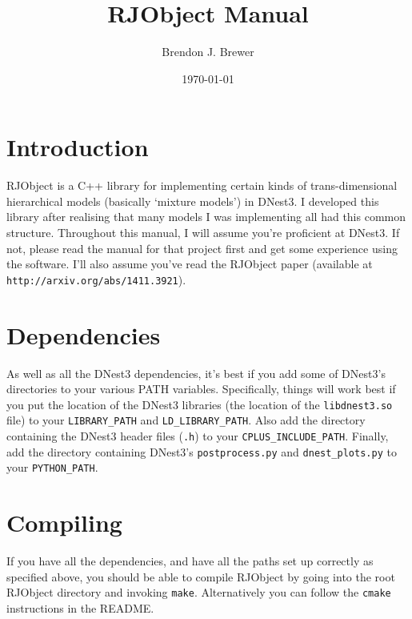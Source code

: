 \documentclass[a4paper, 11pt]{article}
\title{RJObject Manual}
\author{Brendon J. Brewer}
\date{\today}
\begin{document}
\maketitle

\section{Introduction}
RJObject is a C++ library for implementing certain kinds of trans-dimensional
hierarchical models (basically `mixture models') in DNest3. I developed this
library after realising that many models I was implementing all had this
common structure.
Throughout this manual, I will assume you're proficient at
DNest3. If not, please read the manual for that project first and get some
experience using the software. I'll also assume you've read the RJObject
paper (available at {\tt http://arxiv.org/abs/1411.3921}).

\section{Dependencies}
As well as all the DNest3 dependencies, it's best if you add some of DNest3's
directories to your various PATH variables. Specifically, things will work best
if you put the location of the DNest3 libraries (the location of
the {\tt libdnest3.so} file) to your {\tt LIBRARY\_PATH} and
{\tt LD\_LIBRARY\_PATH}. Also add the directory containing the DNest3 header
files ({\tt *.h}) to your {\tt CPLUS\_INCLUDE\_PATH}. Finally, add the
directory containing DNest3's {\tt postprocess.py} and {\tt dnest\_plots.py} to
your {\tt PYTHON\_PATH}.

\section{Compiling}
If you have all the dependencies, and have all the paths set up correctly as
specified above, you should be able to compile RJObject by going into the
root RJObject directory and invoking {\tt make}. Alternatively you can follow
the {\tt cmake} instructions in the README.
\end{document}

